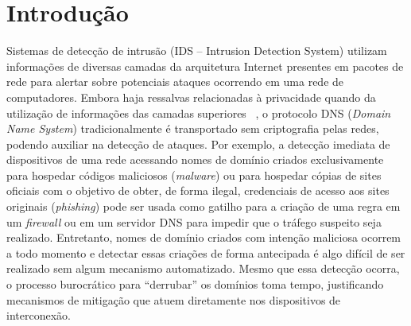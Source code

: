 

\chapter{Introdução}
\label{cap:introducao}

Sistemas de detecção de intrusão (IDS – Intrusion Detection System) utilizam informações de diversas camadas da arquitetura Internet presentes em pacotes de rede para alertar sobre potenciais ataques ocorrendo em uma rede de computadores. Embora haja ressalvas relacionadas à privacidade quando da utilização de informações das camadas superiores ~\citep{daniel-privacidade}, o protocolo DNS (\textit{Domain Name System}) tradicionalmente é transportado sem criptografia pelas redes, podendo auxiliar na detecção de ataques. Por exemplo, a detecção imediata de dispositivos de uma rede acessando nomes de domínio criados exclusivamente para hospedar códigos maliciosos (\textit{malware}) ou para hospedar cópias de sites oficiais com o objetivo de obter, de forma ilegal, credenciais de acesso aos sites originais (\textit{phishing}) pode ser usada como gatilho para a criação de uma regra em um \textit{firewall} ou em um servidor DNS para impedir que o tráfego suspeito seja realizado. Entretanto, nomes de domínio criados com intenção maliciosa ocorrem a todo momento e detectar essas criações de forma antecipada é algo difícil de ser realizado sem algum mecanismo automatizado. Mesmo que essa detecção ocorra, o processo burocrático para “derrubar” os domínios toma tempo, justificando mecanismos de mitigação que atuem diretamente nos dispositivos de interconexão.

